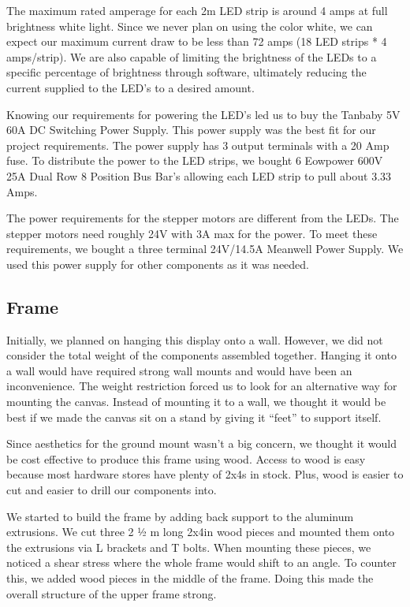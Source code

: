\documentclass[11pt]{IEEEtran}
\begin{document}
The maximum rated amperage for each 2m LED strip is around 4 amps at full brightness white light. Since we never plan on using the color white, we can expect our maximum current draw to be less than 72 amps (18 LED strips * 4 amps/strip). We are also capable of limiting the brightness of the LEDs to a specific percentage of brightness through software, ultimately reducing the current supplied to the LED’s to a desired amount.

Knowing our requirements for powering the LED’s led us to buy the Tanbaby 5V 60A DC Switching Power Supply. This power supply was the best fit for our project requirements. The power supply has 3 output terminals with a 20 Amp fuse. To distribute the power to the LED strips, we bought 6 Eowpower 600V 25A Dual Row 8 Position Bus Bar’s allowing each LED strip to pull about 3.33 Amps.

The power requirements for the stepper motors are different from the LEDs. The stepper motors need roughly 24V with 3A max for the power. To meet these requirements, we bought a three terminal 24V/14.5A Meanwell Power Supply. We used this power supply for other components as it was needed.

\subsection{Frame}
Initially, we planned on hanging this display onto a wall. However, we did not consider the total weight of the components assembled together. Hanging it onto a wall would have required strong wall mounts and would have been an inconvenience. The weight restriction forced us to look for an alternative way for mounting the canvas. Instead of mounting it to a wall, we thought it would be best if we made the canvas sit on a stand by giving it “feet” to support itself. 

Since aesthetics for the ground mount wasn’t a big concern, we thought it would be cost effective to produce this frame using wood. Access to wood is easy because most hardware stores have plenty of 2x4s in stock. Plus, wood is easier to cut and easier to drill our components into.

We started to build the frame by adding back support to the aluminum extrusions. We cut three 2 ½ m long 2x4in wood pieces and mounted them onto the extrusions via L brackets and T bolts. When mounting these pieces, we noticed a shear stress where the whole frame would shift to an angle. To counter this, we added wood pieces in the middle of the frame. Doing this made the overall structure of the upper frame strong.
\end{document}
